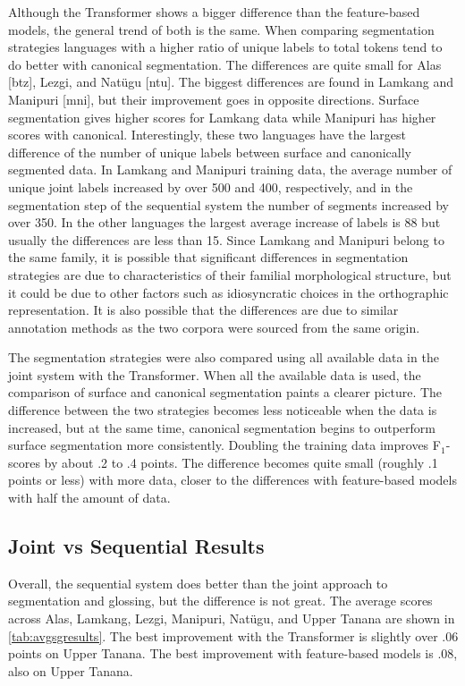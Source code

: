 Although the Transformer shows a bigger difference than the feature-based models, the general trend of both is the same. When comparing segmentation strategies languages with a higher ratio of unique labels to total tokens tend to do better with canonical segmentation. The differences are quite small for Alas [btz], Lezgi, and Nat\"ugu [ntu]. The biggest differences are found in Lamkang and Manipuri [mni], but their improvement goes in opposite directions. Surface segmentation gives higher scores for Lamkang data while Manipuri has higher scores with canonical. Interestingly, these two languages have the largest difference of the number of unique labels between surface and canonically segmented data. In Lamkang and Manipuri training data, the average number of unique joint labels increased by over 500 and 400, respectively, and in the segmentation step of the sequential system the number of segments increased by over 350. In the other languages the largest average increase of labels is 88 but usually the differences are less than 15. Since Lamkang and Manipuri belong to the same family, it is possible that significant differences in segmentation strategies are due to characteristics of their familial morphological structure, but it could be due to other factors such as idiosyncratic choices in the orthographic representation. 
It is also possible that the differences are due to similar annotation methods as the two corpora were sourced from the same origin. %

The segmentation strategies were also compared using all available data in the joint system with the Transformer.  When all the available data is used, the comparison of surface and canonical segmentation paints a clearer picture. The difference between the two strategies becomes less noticeable when the data is increased, but at the same time, canonical segmentation begins to outperform surface segmentation more consistently.  
Doubling the training data improves F$_1$-scores by about .2 to .4 points. The difference becomes quite small (roughly .1 points or less) with more data, closer to the differences with feature-based models with half the amount of data. 


\subsection{Joint vs Sequential Results}

Overall, the sequential system does better than the joint approach to segmentation and glossing, but the difference is not great. The average scores across Alas, Lamkang, Lezgi, Manipuri, Nat\"ugu, and Upper Tanana are shown in \autoref{tab:avgsgresults}. The best improvement with the Transformer is slightly over .06 points on Upper Tanana. The best improvement with feature-based models is .08, also on Upper Tanana. 

